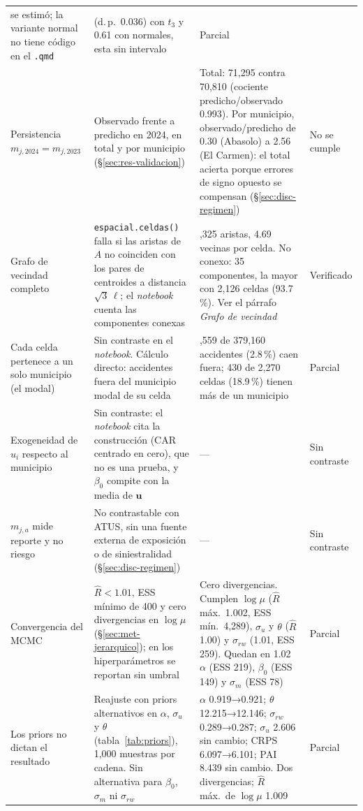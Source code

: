 \begin{table}
\begin{tabular}{@{}>{\raggedright\arraybackslash}p{}>{\raggedright\arraybackslash}p{}>{\raggedright\arraybackslash}p{}>{\raggedright\arraybackslash}p{}@{}}
		se estimó; la variante normal no tiene código en el \texttt{.qmd}
		& 0.289 (d.\,p.\ 0.036) con $t_3$ y 0.61 con normales, esta sin intervalo
		& Parcial \\
		\addlinespace
		Persistencia $m_{j,2024} = m_{j,2023}$
		& Observado frente a predicho en 2024, en total y por municipio
		(§\ref{sec:res-validacion})
		& Total: 71,295 contra 70,810 (cociente predicho/observado 0.993). Por municipio,
		observado/predicho de 0.30 (Abasolo) a 2.56 (El Carmen): el total acierta porque
		errores de signo opuesto se compensan (§\ref{sec:disc-regimen})
		& No se cumple \\
		\addlinespace
		Grafo de vecindad completo
		& \texttt{espacial.celdas()} falla si las aristas de $A$ no coinciden con los
		pares de centroides a distancia $\sqrt{3}\,\ell$; el \emph{notebook} cuenta
		las componentes conexas
		& 5,325 aristas, 4.69 vecinas por celda. No conexo: 35 componentes, la mayor
		con 2,126 celdas (93.7\,\%). Ver el párrafo \emph{Grafo de vecindad}
		& Verificado \\
		\addlinespace
		Cada celda pertenece a un solo municipio (el modal)
		& Sin contraste en el \emph{notebook}. Cálculo directo: accidentes fuera del
		municipio modal de su celda
		& 10,559 de 379,160 accidentes (2.8\,\%) caen fuera; 430 de 2,270 celdas
		(18.9\,\%) tienen más de un municipio
		& Parcial \\
		\addlinespace
		Exogeneidad de $u_i$ respecto al municipio
		& Sin contraste: el \emph{notebook} cita la construcción (CAR centrado en cero),
		que no es una prueba, y $\beta_0$ compite con la media de $\mathbf{u}$
		& ---
		& Sin contraste \\
		\addlinespace
		$m_{j,a}$ mide reporte y no riesgo
		& No contrastable con ATUS, sin una fuente externa de exposición o de
		siniestralidad (§\ref{sec:disc-regimen})
		& ---
		& Sin contraste \\
		\addlinespace
		Convergencia del MCMC
		& $\hat{R} < 1.01$, ESS mínimo de 400 y cero divergencias en $\log\mu$
		(§\ref{sec:met-jerarquico}); en los hiperparámetros se reportan sin umbral
		& Cero divergencias. Cumplen $\log\mu$ ($\hat{R}$ máx.\ 1.002, ESS mín.\ 4,289),
		$\sigma_u$ y $\theta$ ($\hat{R}$ 1.00) y $\sigma_{rw}$ (1.01, ESS 259). Quedan en
		1.02 $\alpha$ (ESS 219), $\beta_0$ (ESS 149) y $\sigma_m$ (ESS 78)
		& Parcial \\
		\addlinespace
		Los priors no dictan el resultado
		& Reajuste con priors alternativos en $\alpha$, $\sigma_u$ y $\theta$
		(tabla~\ref{tab:priors}), 1,000 muestras por cadena. Sin alternativa para $\beta_0$,
		$\sigma_m$ ni $\sigma_{rw}$
		& $\alpha$ 0.919→0.921; $\theta$ 12.215→12.146; $\sigma_{rw}$ 0.289→0.287;
		$\sigma_u$ 2.606 sin cambio; CRPS 6.097→6.101; PAI 8.439 sin cambio. Dos
		divergencias; $\hat{R}$ máx.\ de $\log\mu$ 1.009
		& Parcial \\
		\bottomrule
	\end{tabular}
\end{table}

